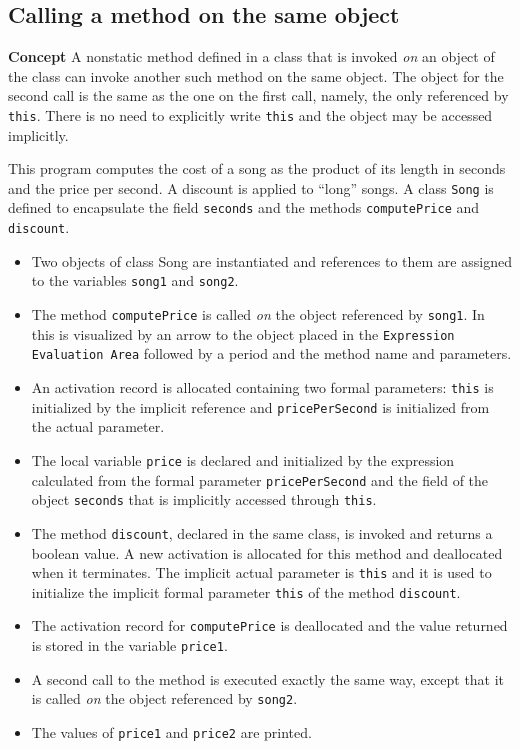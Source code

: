 \subsection{Calling a method on the same object}\label{method.06}

\textbf{Concept} A nonstatic method defined in a class that is invoked
\emph{on} an object of the class can invoke another such method on the same object.
The object for the second call is the same as the one on the first call,
namely, the only referenced by \texttt{this}.
There is no need to explicitly write \texttt{this} and the object may be accessed implicitly.


This program computes the cost of a song as the product of its length
in seconds and the price per second. A discount is applied
to ``long'' songs. A class \texttt{Song} is defined
to encapsulate the field \texttt{seconds} and the methods \texttt{computePrice}
and \texttt{discount}.

\begin{itemize}
\item Two objects of class Song are instantiated and references to them
are assigned to the variables \texttt{song1} and \texttt{song2}.
\item The method \texttt{computePrice} is called \emph{on} the object referenced by \texttt{song1}. In \jel{} this is visualized by an arrow to the object
placed in the \texttt{Expression Evaluation Area} followed by a period and
the method name and parameters.
\item An activation record is allocated containing two formal parameters:
\texttt{this} is initialized by the implicit reference and \texttt{pricePerSecond}
is initialized from the actual parameter.
\item The local variable \texttt{price} is declared and initialized by the
expression calculated from the formal parameter \texttt{pricePerSecond} and
the field of the object \texttt{seconds} that is implicitly accessed through \texttt{this}.
\item The method \texttt{discount}, 
declared in the same class, is invoked and returns a boolean value.
A new activation is allocated for this method and deallocated when it terminates.
The implicit actual parameter is \texttt{this} and it is used to initialize the 
implicit formal parameter \texttt{this} of the method \texttt{discount}.
\item The activation record for \texttt{computePrice} is deallocated 
and the value returned is stored in the variable \texttt{price1}.
\item A second call to the method is executed exactly the same way,
except that it is called \emph{on} the object referenced by \texttt{song2}.
\item The values of \texttt{price1} and \texttt{price2} are printed.
\end{itemize}

